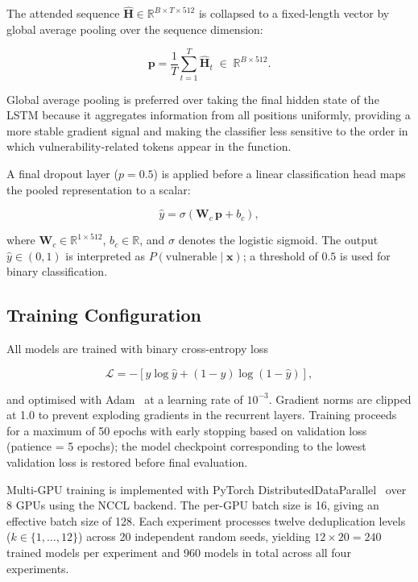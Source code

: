 The attended sequence $\hat{\mathbf{H}} \in \mathbb{R}^{B \times T \times 512}$
is collapsed to a fixed-length vector by global average pooling over the
sequence dimension:

\begin{equation}
  \mathbf{p} = \frac{1}{T}\sum_{t=1}^{T} \hat{\mathbf{H}}_t
  \;\in\; \mathbb{R}^{B \times 512}.
  \label{eq:gap}
\end{equation}

\noindent
Global average pooling is preferred over taking the final hidden state of the
LSTM because it aggregates information from all positions uniformly,
providing a more stable gradient signal and making the classifier less
sensitive to the order in which vulnerability-related tokens appear in the
function.

A final dropout layer ($p = 0.5$) is applied before a linear classification
head maps the pooled representation to a scalar:

\begin{equation}
  \hat{y} = \sigma\!\left( \mathbf{W}_c \, \mathbf{p} + b_c \right),
  \label{eq:classifier}
\end{equation}

\noindent
where $\mathbf{W}_c \in \mathbb{R}^{1 \times 512}$, $b_c \in \mathbb{R}$,
and $\sigma$ denotes the logistic sigmoid.
The output $\hat{y} \in (0, 1)$ is interpreted as $P(\text{vulnerable} \mid
\mathbf{x})$; a threshold of $0.5$ is used for binary classification.

\subsection{Training Configuration}
\label{sec:training}

All models are trained with binary cross-entropy loss

\begin{equation}
  \mathcal{L} = -\left[
    y \log \hat{y} + (1 - y) \log (1 - \hat{y})
  \right],
  \label{eq:bce}
\end{equation}

\noindent
and optimised with Adam~\cite{adam} at a learning rate of $10^{-3}$.
Gradient norms are clipped at 1.0 to prevent exploding gradients in the
recurrent layers.
Training proceeds for a maximum of 50 epochs with early stopping based on
validation loss (patience = 5 epochs); the model checkpoint corresponding to
the lowest validation loss is restored before final evaluation.

Multi-GPU training is implemented with PyTorch
DistributedDataParallel~\cite{pytorch} over 8 GPUs using the NCCL backend.
The per-GPU batch size is 16, giving an effective batch size of 128.
Each experiment processes twelve deduplication levels
($k \in \{1, \dots, 12\}$) across 20 independent random seeds, yielding
$12 \times 20 = 240$ trained models per experiment and 960 models in total
across all four experiments.

